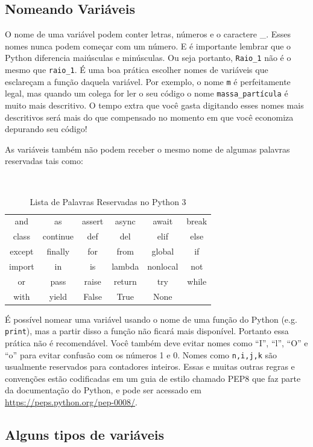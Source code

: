 \subsection{Nomeando Variáveis}\label{sc:naming-var}
O nome de uma variável podem conter letras, números e o caractere \_. Esses nomes nunca podem começar com um número. E é importante lembrar que o Python diferencia maiúsculas e minúsculas. Ou seja portanto, {\tt Raio\_1} não é o mesmo que {\tt raio\_1}. É uma boa prática escolher nomes de variáveis que esclareçam a função daquela variável. Por exemplo, o nome {\tt m} é perfeitamente legal, mas quando um colega for ler o seu código o nome  {\tt massa\_partícula} é muito mais descritivo. O tempo extra que você gasta digitando esses nomes mais descritivos será mais do que compensado no momento em que você economiza depurando seu código!

As variáveis também não podem receber o mesmo nome de algumas palavras reservadas tais como:
\begin{table}[h!]
    \centering
    {\tt 
    \begin{tabular}{cccccc}
    and & as &  assert & async & await & break \\
    class & continue &  def & del & elif & else \\
    except & finally &  for & from & global & if \\
    import & in &  is & lambda & nonlocal & not \\
    or & pass & raise & return & try & while \\
    with & yield &  False & True & None &  \\
    \end{tabular}}
    \caption{Lista de Palavras Reservadas no Python 3}
    \label{tab:my_label}
\end{table}

É possível nomear uma variável usando o nome de uma função do Python (e.g. {\tt print}), mas a partir disso a função não ficará mais disponível. Portanto essa prática não é recomendável. Você também deve evitar nomes como ``I'', ``l'', ``O'' e ``o'' para evitar confusão com os números 1 e 0. Nomes como {\tt n,i,j,k} são usualmente reservados para contadores inteiros. Essas e muitas outras regras e convenções estão codificadas em um guia de estilo chamado PEP8 que faz parte da documentação do Python, e pode ser acessado em \href{https://peps.python.org/pep-0008/}{https://peps.python.org/pep-0008/}.

\subsection{Alguns tipos de variáveis}

